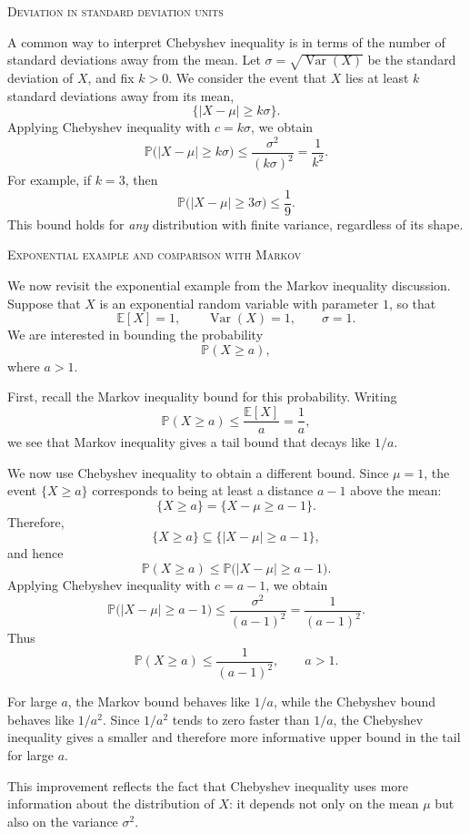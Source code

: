 \bigskip
\textsc{Deviation in standard deviation units}

A common way to interpret Chebyshev inequality is in terms of the number of standard deviations away from the mean.  
Let \(\sigma = \sqrt{\operatorname{Var}(X)}\) be the standard deviation of \(X\), and fix \(k > 0\).  
We consider the event that \(X\) lies at least \(k\) standard deviations away from its mean,
\[
\{|X - \mu| \ge k \sigma\}.
\]
Applying Chebyshev inequality with \(c = k \sigma\), we obtain
\[
\mathbb{P}\big(|X - \mu| \ge k \sigma\big)
\le
\frac{\sigma^{2}}{(k \sigma)^{2}}
=
\frac{1}{k^{2}}.
\]
For example, if \(k = 3\), then
\[
\mathbb{P}\big(|X - \mu| \ge 3 \sigma\big) \le \frac{1}{9}.
\]
This bound holds for \textit{any} distribution with finite variance, regardless of its shape.  

\bigskip
\textsc{Exponential example and comparison with Markov}

We now revisit the exponential example from the Markov inequality discussion.  
Suppose that \(X\) is an exponential random variable with parameter \(1\), so that
\[
\mathbb{E}[X] = 1,
\qquad
\operatorname{Var}(X) = 1,
\qquad
\sigma = 1.
\]
We are interested in bounding the probability
\[
\mathbb{P}(X \ge a),
\]
where \(a > 1\).  

First, recall the Markov inequality bound for this probability.  
Writing
\[
\mathbb{P}(X \ge a)
\le
\frac{\mathbb{E}[X]}{a}
=
\frac{1}{a},
\]
we see that Markov inequality gives a tail bound that decays like \(1/a\).  

We now use Chebyshev inequality to obtain a different bound.  
Since \(\mu = 1\), the event \(\{X \ge a\}\) corresponds to being at least a distance \(a - 1\) above the mean:
\[
\{X \ge a\}
=
\{X - \mu \ge a - 1\}.
\]
Therefore,
\[
\{X \ge a\}
\subseteq
\{|X - \mu| \ge a - 1\},
\]
and hence
\[
\mathbb{P}(X \ge a)
\le
\mathbb{P}\big(|X - \mu| \ge a - 1\big).
\]
Applying Chebyshev inequality with \(c = a - 1\), we obtain
\[
\mathbb{P}\big(|X - \mu| \ge a - 1\big)
\le
\frac{\sigma^{2}}{(a - 1)^{2}}
=
\frac{1}{(a - 1)^{2}}.
\]
Thus
\[
\mathbb{P}(X \ge a)
\le
\frac{1}{(a - 1)^{2}},
\qquad a > 1.
\]

For large \(a\), the Markov bound behaves like \(1/a\), while the Chebyshev bound behaves like \(1/a^{2}\).  
Since \(1/a^{2}\) tends to zero faster than \(1/a\), the Chebyshev inequality gives a smaller and therefore more informative upper bound in the tail for large \(a\).  

This improvement reflects the fact that Chebyshev inequality uses more information about the distribution of \(X\): it depends not only on the mean \(\mu\) but also on the variance \(\sigma^{2}\).


